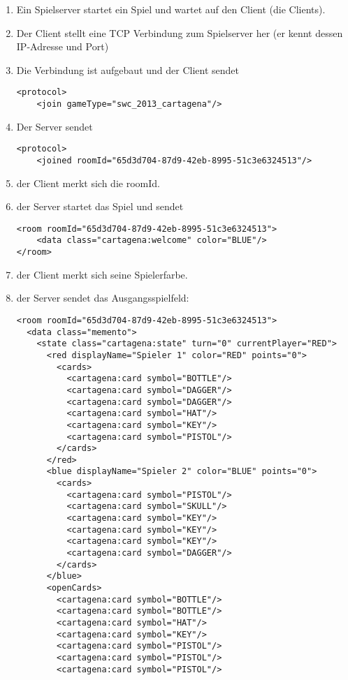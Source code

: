 \documentclass[12pt,a4paper, ngerman, oneside]{scrartcl}
\begin{document}
\begin{enumerate}
\item Ein Spielserver startet ein Spiel und wartet auf den Client (die Clients).
\item Der Client stellt eine TCP Verbindung zum Spielserver her (er kennt dessen IP-Adresse und Port)
\item Die Verbindung ist aufgebaut und der Client sendet \begin{verbatim}
<protocol>
    <join gameType="swc_2013_cartagena"/>
\end{verbatim}
\item Der Server sendet \begin{verbatim}
<protocol>
    <joined roomId="65d3d704-87d9-42eb-8995-51c3e6324513"/>
\end{verbatim}
\item der Client merkt sich die roomId.
\item der Server startet das Spiel und sendet \begin{verbatim}
<room roomId="65d3d704-87d9-42eb-8995-51c3e6324513">
    <data class="cartagena:welcome" color="BLUE"/>
</room>
\end{verbatim}
\item der Client merkt sich seine Spielerfarbe.
\item der Server sendet das Ausgangsspielfeld: 
\begin{verbatim}
<room roomId="65d3d704-87d9-42eb-8995-51c3e6324513">
  <data class="memento">
    <state class="cartagena:state" turn="0" currentPlayer="RED">
      <red displayName="Spieler 1" color="RED" points="0">
        <cards>
          <cartagena:card symbol="BOTTLE"/>
          <cartagena:card symbol="DAGGER"/>
          <cartagena:card symbol="DAGGER"/>
          <cartagena:card symbol="HAT"/>
          <cartagena:card symbol="KEY"/>
          <cartagena:card symbol="PISTOL"/>
        </cards>
      </red>
      <blue displayName="Spieler 2" color="BLUE" points="0">
        <cards>
          <cartagena:card symbol="PISTOL"/>
          <cartagena:card symbol="SKULL"/>
          <cartagena:card symbol="KEY"/>
          <cartagena:card symbol="KEY"/>
          <cartagena:card symbol="KEY"/>
          <cartagena:card symbol="DAGGER"/>
        </cards>
      </blue>
      <openCards>
        <cartagena:card symbol="BOTTLE"/>
        <cartagena:card symbol="BOTTLE"/>
        <cartagena:card symbol="HAT"/>
        <cartagena:card symbol="KEY"/>
        <cartagena:card symbol="PISTOL"/>
        <cartagena:card symbol="PISTOL"/>
        <cartagena:card symbol="PISTOL"/>

\end{verbatim}
\end{enumerate}
\end{document}
